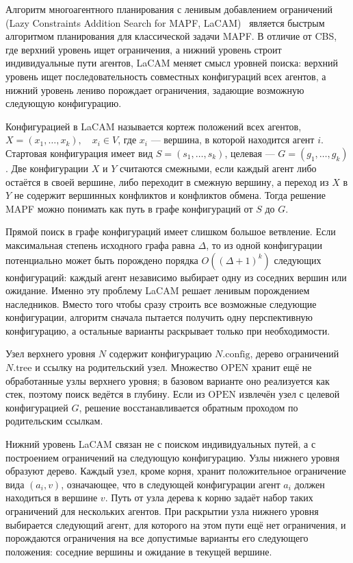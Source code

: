 Алгоритм многоагентного планирования с ленивым добавлением ограничений (Lazy Constraints Addition
Search for MAPF, LaCAM)~\cite{lacam,lacam2,lacam3} является быстрым алгоритмом планирования для классической задачи MAPF. В отличие
от CBS, где верхний уровень ищет ограничения, а нижний уровень строит индивидуальные пути агентов,
LaCAM меняет смысл уровней поиска: верхний уровень ищет последовательность совместных конфигураций
всех агентов, а нижний уровень лениво порождает ограничения, задающие возможную следующую
конфигурацию.

Конфигурацией в LaCAM называется кортеж положений всех агентов, $X = (x_1, \ldots, x_k), \quad x_i \in V$,
где $x_i$ --- вершина, в которой находится агент $i$. Стартовая конфигурация имеет вид
$S = (s_1, \ldots, s_k)$, целевая --- $G = (g_1, \ldots, g_k)$. Две конфигурации $X$ и $Y$ считаются
смежными, если каждый агент либо остаётся в своей вершине, либо переходит в смежную вершину, а переход
из $X$ в $Y$ не содержит вершинных конфликтов и конфликтов обмена. Тогда решение MAPF можно понимать
как путь в графе конфигураций от $S$ до $G$.

Прямой поиск в графе конфигураций имеет слишком большое ветвление. Если максимальная степень исходного
графа равна $\Delta$, то из одной конфигурации потенциально может быть порождено порядка
$O((\Delta + 1)^k)$ следующих конфигураций: каждый агент независимо выбирает одну из соседних вершин
или ожидание. Именно эту проблему LaCAM решает ленивым порождением наследников. Вместо того чтобы сразу
строить все возможные следующие конфигурации, алгоритм сначала пытается получить одну перспективную
конфигурацию, а остальные варианты раскрывает только при необходимости.

Узел верхнего уровня $N$ содержит конфигурацию $N.\mathrm{config}$, дерево ограничений
$N.\mathrm{tree}$ и ссылку на родительский узел. Множество $\mathrm{OPEN}$ хранит ещё не обработанные
узлы верхнего уровня; в базовом варианте оно реализуется как стек, поэтому поиск ведётся в глубину.
Если из $\mathrm{OPEN}$ извлечён узел с целевой конфигурацией $G$, решение восстанавливается обратным
проходом по родительским ссылкам.

Нижний уровень LaCAM связан не с поиском индивидуальных путей, а с построением ограничений на следующую
конфигурацию. Узлы нижнего уровня образуют дерево. Каждый узел, кроме корня, хранит положительное
ограничение вида $(a_i, v)$, означающее, что в следующей конфигурации агент $a_i$ должен находиться
в вершине $v$. Путь от узла дерева к корню задаёт набор таких ограничений для нескольких агентов.
При раскрытии узла нижнего уровня выбирается следующий агент, для которого на этом пути ещё нет
ограничения, и порождаются ограничения на все допустимые варианты его следующего положения:
соседние вершины и ожидание в текущей вершине.

